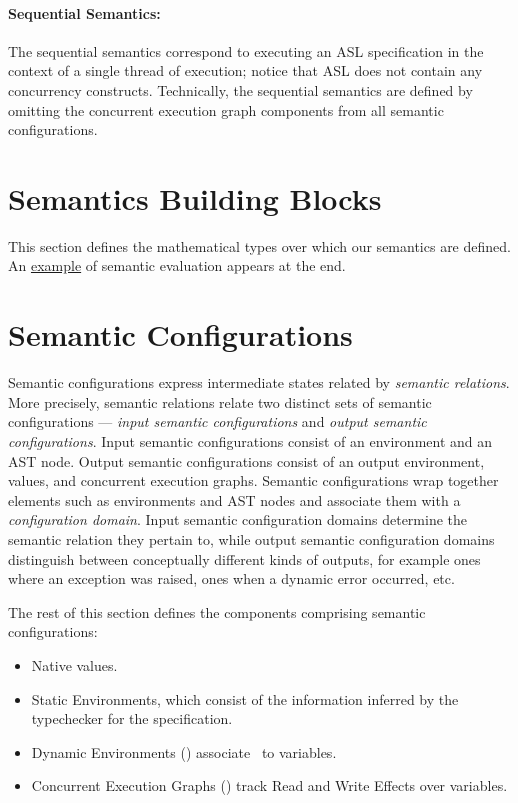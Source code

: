 \paragraph{Sequential Semantics:}
The sequential semantics correspond to executing an ASL specification in the context of a single thread
of execution; notice that ASL does not contain any concurrency constructs.
%
Technically, the sequential semantics are defined by omitting the concurrent execution graph components
from all semantic configurations.

\section{Semantics Building Blocks}
\label{sec:semanticsbuildingblocks}
This section defines the mathematical types over which our semantics are defined.
An \hyperlink{eval-example}{example} of semantic evaluation appears at the end.

\section{Semantic Configurations\label{sec:SemanticConfigurations}}

Semantic configurations express intermediate states related by \emph{semantic relations}.
%
More precisely, semantic relations relate two distinct sets of semantic configurations ---
\emph{input semantic configurations} and \emph{output semantic configurations}.
Input semantic configurations consist of an environment and an AST node.
Output semantic configurations consist of an output environment, values,
and concurrent execution graphs.
%
Semantic configurations wrap together elements such as environments and AST nodes
and associate them with a \emph{configuration domain}. Input semantic configuration domains
determine the semantic relation they pertain to, while output semantic configuration
domains distinguish between conceptually different kinds of outputs, for example
ones where an exception was raised, ones when a dynamic error occurred, etc.

The rest of this section defines the components comprising semantic configurations:
\begin{itemize}
    \item Native values.
    \item Static Environments, which consist of the information inferred
            by the typechecker for the specification.
    \item Dynamic Environments () associate \nativevalues\ to variables.
    \item Concurrent Execution Graphs () track Read and Write Effects over variables.
\end{itemize}

